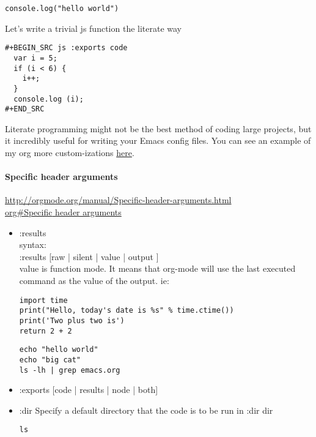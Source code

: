 \documentclass[11pt]{article}
\begin{document}
\begin{verbatim}
console.log("hello world")
\end{verbatim}

Let's write a trivial js function the literate way

\begin{verbatim}
#+BEGIN_SRC js :exports code
  var i = 5;
  if (i < 6) {
    i++;
  }
  console.log (i);
#+END_SRC
\end{verbatim}

Literate programming might not be the best method of coding large projects, but it incredibly useful for writing your Emacs config files.  You can see an example of my org more custom-izations \href{https://github.com/jbranso/.emacs.d/blob/master/lisp/init-org.org}{here}.
\paragraph{Specific header arguments}
\label{sec:orgheadline18}

\url{http://orgmode.org/manual/Specific-header-arguments.html} \\
\href{org#Specific\%20header\%20arguments}{\url{org#Specific} header arguments} \\

\begin{itemize}
\item :results \\
syntax: \\
:results [raw | silent | value | output ] \\
value is function mode.  It means that org-mode will use the last executed command as the value of the output. ie:

\begin{verbatim}
import time
print("Hello, today's date is %s" % time.ctime())
print('Two plus two is')
return 2 + 2
\end{verbatim}

\begin{verbatim}
echo "hello world"
echo "big cat"
ls -lh | grep emacs.org
\end{verbatim}
\item :exports [code | results | node | both]
\item :dir
Specify a default directory that the code is to be run in
:dir dir

\begin{verbatim}
ls
\end{verbatim}
\end{itemize}
\end{document}

